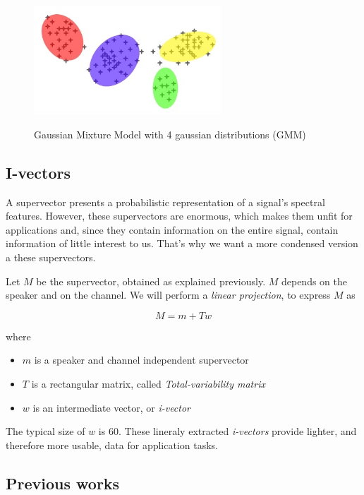 \documentclass[conference]{IEEEtran}
\begin{document}
\begin{figure}[!h]
    \centering
    \caption{Gaussian Mixture Model with 4 gaussian distributions (GMM)}
    \includegraphics[width=7cm]{GMM.jpg}
    \label{gmm}
\end{figure}

\subsection{I-vectors}

A supervector presents a probabilistic representation of a signal's spectral features. 
However, these supervectors are enormous, which makes them unfit for
applications and, since they contain information on the entire signal, contain
information of little interest to us.
That's why we want a more condensed version a these supervectors.


Let $M$ be the supervector, obtained as explained previously. $M$ depends on the speaker and on the channel. 
We will perform a \emph{linear projection}, to express $M$ as

\begin{equation}
  M = m + Tw
  \label{eq:i}
\end{equation}

\noindent where
\begin{itemize}
\item $m$ is a speaker and channel independent supervector
\item $T$ is a rectangular matrix, called \emph{Total-variability matrix}
\item $w$ is an intermediate vector, or \emph{i-vector}
\end{itemize}

The typical size of $w$ is $60$. These lineraly extracted \emph{i-vectors} provide lighter, and therefore more usable, data for application tasks.

\subsection{Previous works}
\end{document}
